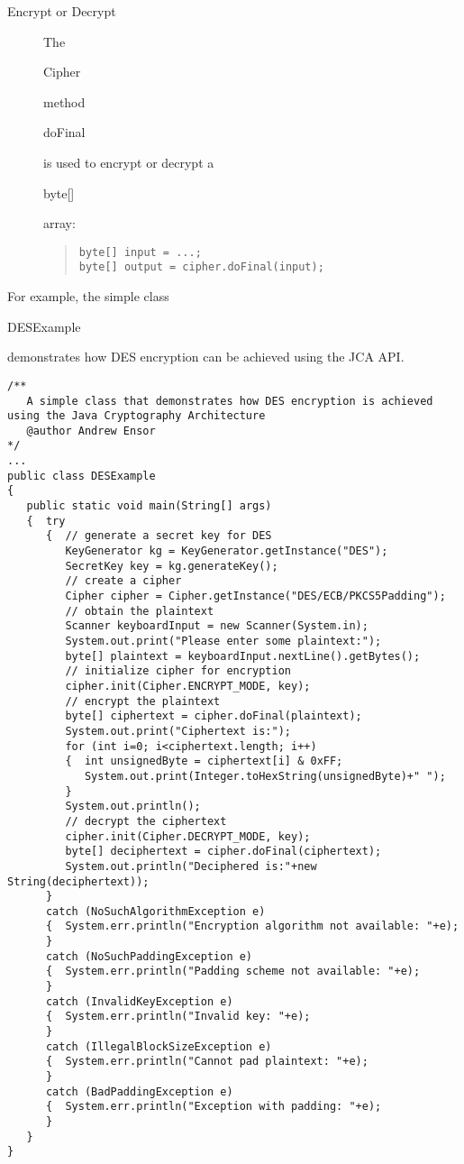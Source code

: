 \begin{description}
  \item[Encrypt or Decrypt]
  The \begin{code}Cipher\end{code} method \begin{code}doFinal\end{code}
  is used to encrypt or decrypt a \begin{code}byte[]\end{code} array:
\begin{quote}\begin{code}\begin{verbatim}
byte[] input = ...;
byte[] output = cipher.doFinal(input);
\end{verbatim}\end{code}\end{quote}
\end{description}

For example, the simple class \begin{code}DESExample\end{code} demonstrates
how DES encryption can be achieved using the JCA API.

\begin{lstlisting}[caption=DES encryption with Java Cryptography Architecture]
/**
   A simple class that demonstrates how DES encryption is achieved using the Java Cryptography Architecture
   @author Andrew Ensor
*/
...
public class DESExample
{
   public static void main(String[] args)
   {  try
      {  // generate a secret key for DES
         KeyGenerator kg = KeyGenerator.getInstance("DES");
         SecretKey key = kg.generateKey();
         // create a cipher
         Cipher cipher = Cipher.getInstance("DES/ECB/PKCS5Padding");
         // obtain the plaintext
         Scanner keyboardInput = new Scanner(System.in);
         System.out.print("Please enter some plaintext:");
         byte[] plaintext = keyboardInput.nextLine().getBytes();
         // initialize cipher for encryption
         cipher.init(Cipher.ENCRYPT_MODE, key);
         // encrypt the plaintext
         byte[] ciphertext = cipher.doFinal(plaintext);
         System.out.print("Ciphertext is:");
         for (int i=0; i<ciphertext.length; i++)
         {  int unsignedByte = ciphertext[i] & 0xFF;
            System.out.print(Integer.toHexString(unsignedByte)+" ");
         }
         System.out.println();
         // decrypt the ciphertext
         cipher.init(Cipher.DECRYPT_MODE, key);
         byte[] deciphertext = cipher.doFinal(ciphertext);
         System.out.println("Deciphered is:"+new String(deciphertext));
      }
      catch (NoSuchAlgorithmException e)
      {  System.err.println("Encryption algorithm not available: "+e);
      }
      catch (NoSuchPaddingException e)
      {  System.err.println("Padding scheme not available: "+e);
      }
      catch (InvalidKeyException e)
      {  System.err.println("Invalid key: "+e);
      }
      catch (IllegalBlockSizeException e)
      {  System.err.println("Cannot pad plaintext: "+e);
      }
      catch (BadPaddingException e)
      {  System.err.println("Exception with padding: "+e);
      }
   }
}
\end{lstlisting}

